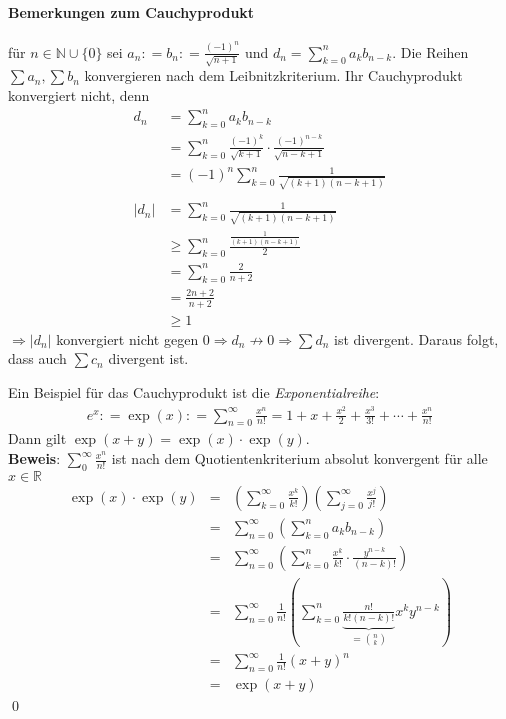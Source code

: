 \documentclass[ngerman,titlepage,twoside, parskip=half*]{scrreprt}
\newcommand*{\N}{\mathbb{N}}
\newcommand*{\R}{\mathbb{R}}
\theoremstyle{plain}
\theoremstyle{definition}
\theoremstyle{remark}
\newcommand*{\abs}[2][]{#1\lvert#2#1\rvert}
\newcommand*{\coloneqq}{\mathrel{\mathop:}=}
\begin{document}
\paragraph{Bemerkungen zum Cauchyprodukt} für $n\in \N\cup \{0\}$ sei
$a_n\coloneqq b_n\coloneqq\frac{(-1)^n}{\sqrt{n+1}}$ und 
$d_n=\sum_{k=0}^n a_kb_{n-k}$. Die Reihen $\sum a_n, \sum b_n$ konvergieren nach dem Leibnitzkriterium. Ihr 
Cau\-chy\-pro\-dukt konvergiert nicht, denn 
\begin{align*}
  d_n &= \sum_{k=0}^n a_k b_{n-k}\\
  &= \sum_{k=0}^n \frac{(-1)^k}{\sqrt{k+1}}\cdot \frac{(-1)^{n-k}}{\sqrt{n-k+1}}\\
  &= (-1)^n \sum_{k=0}^n \frac{1}{\sqrt{(k+1)(n-k+1)}}\\
  \\
  \abs{d_n} &= \sum_{k=0}^n \frac{1}{\sqrt{(k+1)(n-k+1)}}\\
  &\geq \sum_{k=0}^n \frac{\frac{1}{(k+1)(n-k+1)}}{2}\\
  &= \sum_{k=0}^n \frac{2}{n+2}\\
  &= \frac{2n+2}{n+2}\\
  &\geq 1
\end{align*}
$\Rightarrow \abs{d_n}$ konvergiert nicht gegen $0\Rightarrow d_n \not\rightarrow 0\Rightarrow \sum d_n$ ist divergent. Daraus
folgt, dass auch $\sum c_n$ divergent ist.

Ein Beispiel für das Cauchyprodukt ist die \emph{Exponentialreihe}:
\begin{gather*}e^x \coloneqq \exp(x)\coloneqq\sum_{n=0}^\infty \frac{x^n}{n!}=1+x+\frac{x^2}{2}+\frac{x^3}{3!}+\cdots +\frac{x^n}{n!}\end{gather*}
Dann gilt $\exp(x+y)=\exp(x)\cdot \exp(y)$.\\
\textbf{Beweis}: $\sum_0^\infty \frac{x^n}{n!}$ ist nach dem Quotientenkriterium absolut konvergent für alle $x\in \R$
\begin{align*}
  \exp(x)\cdot \exp(y) & = & \left(\sum_{k=0}^\infty \frac{x^k}{k!}\right)\left(\sum_{j=0}^\infty \frac{x^j}{j!}\right)\\
  & = & \sum_{n=0}^\infty \left(\sum_{k=0}^n a_k b_{n-k}\right)\\
  & = & \sum_{n=0}^\infty \left(\sum_{k=0}^n \frac{x^k}{k!}\cdot \frac{y^{n-k}}{(n-k)!}\right)\\
  & = & \sum_{n=0}^\infty \frac{1}{n!} \left(\sum_{k=0}^n \underbrace{\frac{n!}{k!(n-k)!}}_{=\binom{n}{k}} x^k y^{n-k}\right)\\
  & = & \sum_{n=0}^\infty \frac{1}{n!}(x+y)^n\\
  & = & \exp(x+y)
\end{align*}
\qed
\end{document}

